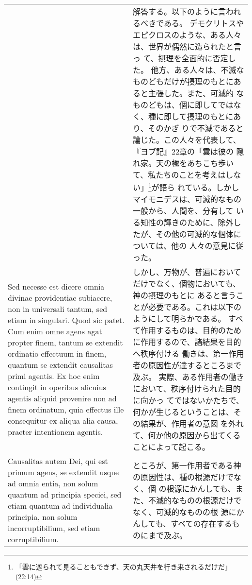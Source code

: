 \documentclass[10pt]{jsarticle} %
\begin{document}
\begin{longtable}{p{21em}p{21em}}
&

解答する。以下のように言われるべきである。
デモクリトスやエピクロスのような、ある人々は、世界が偶然に造られたと言っ
 て、摂理を全面的に否定した。
他方、ある人々は、不滅なものどもだけが摂理のもとにあると主張した。また、可滅的
 なものどもは、個に即してではなく、種に即して摂理のもとにあり、そのかぎ
 りで不滅であると論じた。この人々を代表して、『ヨブ記』22章の「雲は彼の
 隠れ家。天の極をあちこち歩いて、私たちのことを考えはしない」\footnote{「雲に遮られて見ることもできず、天の丸天井を行き来されるだけだ」(22:14)}が語ら
 れている。しかしマイモニデスは、可滅的なもの一般から、人間を、分有して
 いる知性の輝きのために、除外したが、その他の可滅的な個体については、他の
 人々の意見に従った。


\\



Sed necesse est dicere omnia divinae providentiae
subiacere, non in universali tantum, sed etiam in singulari. Quod sic
patet. Cum enim omne agens agat propter finem, tantum se extendit
ordinatio effectuum in finem, quantum se extendit causalitas primi
agentis. 
Ex hoc enim contingit in operibus alicuius agentis aliquid
provenire non ad finem ordinatum, quia effectus ille consequitur ex
aliqua alia causa, praeter intentionem agentis.

&

しかし、万物が、普遍においてだけでなく、個物においても、神の摂理のもとに
 あると言うことが必要である。これは以下のようにして明らかである。
すべて作用するものは、目的のために作用するので、諸結果を目的へ秩序付ける
 働きは、第一作用者の原因性が達するところまで及ぶ。
実際、ある作用者の働きにおいて、秩序付けられた目的に向かっ
 てではないかたちで、何かが生じるということは、その結果が、作用者の意図
 を外れて、何か他の原因から出てくることによって起こる。




\\


 Causalitas autem Dei,
qui est primum agens, se extendit usque ad omnia entia, non solum
quantum ad principia speciei, sed etiam quantum ad individualia
principia, non solum incorruptibilium, sed etiam corruptibilium.



&

ところが、第一作用者である神の原因性は、種の根源だけでなく、個
 の根源にかんしても、また、不滅的なものの根源だけでなく、可滅的なものの根
 源にかんしても、すべての存在するものにまで及ぶ。



\end{longtable}
\end{document}
